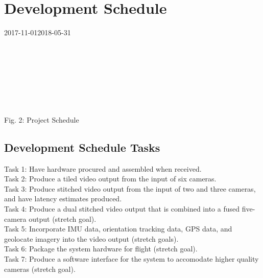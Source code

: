 \documentclass[letterpaper,10pt,serif,draftclsnofoot,onecolumn,compsoc,titlepage]{IEEEtran}
\begin{document}
\section{Development Schedule}
	\begin{ganttchart}
    	[hgrid, x unit=0.77mm, y unit chart=9.0mm, title label font=\normalsize, time slot format=isodate]
    	{2017-11-01}{2018-05-31}
    	\\
    	\\
    	\\
    	\\
    	\\
    	\\
    	\\
    	\\
	\end{ganttchart}
\begin{center}
	Fig. 2: Project Schedule
\end{center}	

\subsection{Development Schedule Tasks}
Task 1: Have hardware procured and assembled when received.\\
Task 2: Produce a tiled video output from the input of six cameras.\\
Task 3: Produce stitched video output from the input of two and three cameras, 
and have latency estimates produced.\\
Task 4: Produce a dual stitched video output that is combined into a fused 
five-camera output (stretch goal).\\
Task 5: Incorporate IMU data, orientation tracking data, GPS data, and 
geolocate imagery into the video output (stretch goals).\\
Task 6: Package the system hardware for flight (stretch goal).\\
Task 7: Produce a software interface for the system to accomodate higher 
quality cameras (stretch goal).\\
\end{document}
